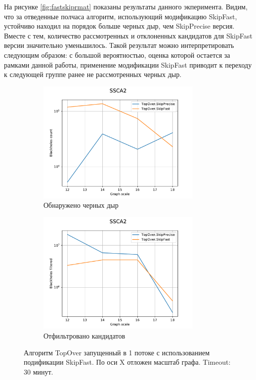 \documentclass[12pt,a4paper,oneside,openany]{article}
\theoremstyle{definition}
\theoremstyle{lemma}
\theoremstyle{remark}
\begin{document}
На рисунке \ref{fig:fastskiprmat} показаны результаты данного экперимента. Видим, что за
отведенные полчаса алгоритм, использующий модификацию SkipFast, устойчиво находил на
порядок больше черных дыр, чем SkipPrecise версия. Вместе с тем, количество
рассмотренных и отклоненных кандидатов для SkipFast версии значительно уменьшилось.
Такой результат можно интерпретировать следующим образом: с большой вероятностью, оценка которой
остается за рамками данной работы, применение модификации SkipFast приводит к переходу к следующей
группе ранее не рассмотренных черных дыр.

\begin{figure}[H]
    \begin{subfigure}{.5\textwidth}
      \centering
      \includegraphics[width=8cm]{images/7_count_SSCA2.pdf}
      \caption{Обнаружено черных дыр}
      \label{fig:fastskipssca:count}
    \end{subfigure}
    \begin{subfigure}{.5\textwidth}
      \centering
      \includegraphics[width=8cm,height=6cm]{images/7_filtered_SSCA2.pdf}
      \caption{Отфильтровано кандидатов}
      \label{fig:fastskipssca:filtered}
    \end{subfigure}
    \caption{Алгоритм TopOver запущенный в 1 потоке с использованием подификации SkipFast. По оси X отложен масштаб графа. Timeout: 30 минут.}
    \label{fig:fastskipssca}
\end{figure}
\end{document}
